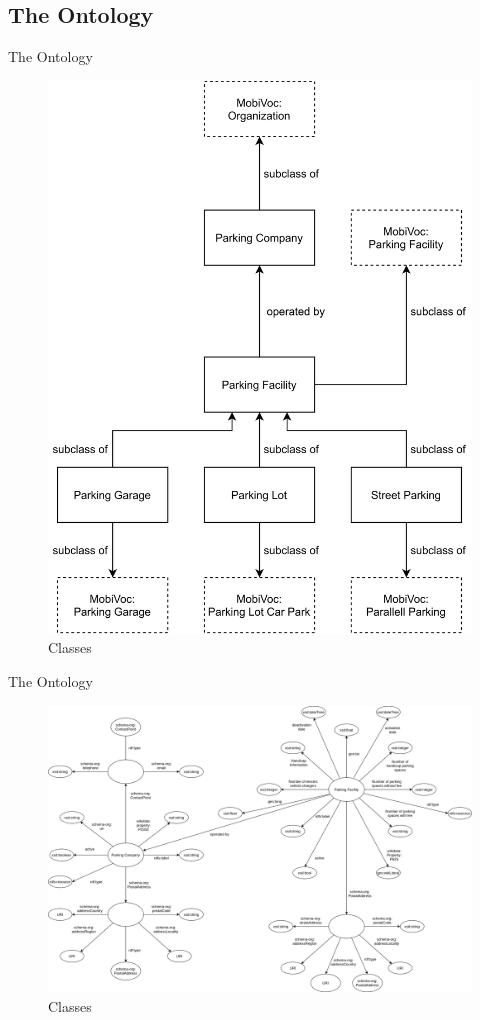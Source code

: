 \documentclass{beamer}
\begin{document}
	\subsection{The Ontology}
	\begin{frame}{The Ontology}
		\begin{figure}
			\includegraphics[scale=0.08]{resources/ontology-class.png}
			\caption{Classes}
		\end{figure}
	\end{frame}
	\begin{frame}{The Ontology}
		\begin{figure}
			\includegraphics[scale=0.10]{resources/entities-attributes.png}
			\caption{Classes}
		\end{figure}
	\end{frame}
\end{document}
